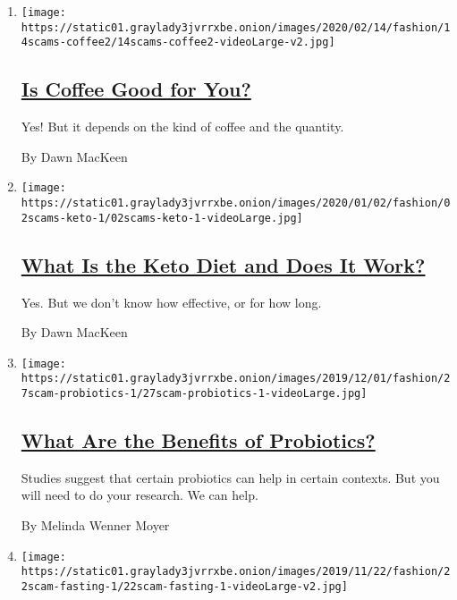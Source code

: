 \begin{enumerate}
\def\labelenumi{\arabic{enumi}.}
\item
  \texttt{[image: https://static01.graylady3jvrrxbe.onion/images/2020/02/14/fashion/14scams-coffee2/14scams-coffee2-videoLarge-v2.jpg]}

  \hypertarget{is-coffee-good-for-you}{%
  \subsection{\texorpdfstring{\href{/2020/02/13/style/self-care/coffee-benefits.html}{Is
  Coffee Good for
  You?}}{Is Coffee Good for You?}}\label{is-coffee-good-for-you}}

  Yes! But it depends on the kind of coffee and the quantity.

  By Dawn MacKeen
\item
  \texttt{[image: https://static01.graylady3jvrrxbe.onion/images/2020/01/02/fashion/02scams-keto-1/02scams-keto-1-videoLarge.jpg]}

  \hypertarget{what-is-the-keto-diet-and-does-it-work}{%
  \subsection{\texorpdfstring{\href{/2020/01/02/style/self-care/keto-diet-explained-benefits.html}{What
  Is the Keto Diet and Does It
  Work?}}{What Is the Keto Diet and Does It Work?}}\label{what-is-the-keto-diet-and-does-it-work}}

  Yes. But we don't know how effective, or for how long.

  By Dawn MacKeen
\item
  \texttt{[image: https://static01.graylady3jvrrxbe.onion/images/2019/12/01/fashion/27scam-probiotics-1/27scam-probiotics-1-videoLarge.jpg]}

  \hypertarget{what-are-the-benefits-of-probiotics}{%
  \subsection{\texorpdfstring{\href{/2019/11/27/style/self-care/probiotics-benefits.html}{What
  Are the Benefits of
  Probiotics?}}{What Are the Benefits of Probiotics?}}\label{what-are-the-benefits-of-probiotics}}

  Studies suggest that certain probiotics can help in certain contexts.
  But you will need to do your research. We can help.

  By Melinda Wenner Moyer
\item
  \texttt{[image: https://static01.graylady3jvrrxbe.onion/images/2019/11/22/fashion/22scam-fasting-1/22scam-fasting-1-videoLarge-v2.jpg]}


\end{enumerate}
